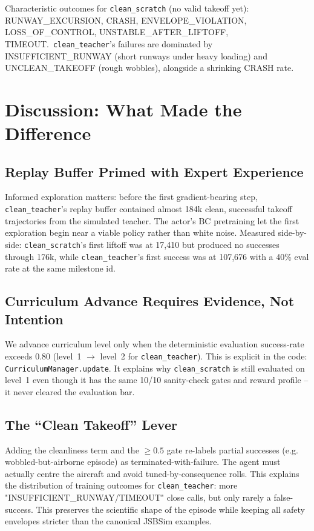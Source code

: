 \documentclass[11pt,a4paper]{article}
\begin{document}
Characteristic outcomes for \texttt{clean\_scratch} (no valid takeoff yet): RUNWAY\_EXCURSION, CRASH,
ENVELOPE\_VIOLATION, LOSS\_OF\_CONTROL, UNSTABLE\_AFTER\_LIFTOFF, TIMEOUT.\ \texttt{clean\_teacher}'s
failures are dominated by INSUFFICIENT\_RUNWAY (short runways under heavy loading) and UNCLEAN\_TAKEOFF
(rough wobbles), alongside a shrinking CRASH rate.

\section{Discussion: What Made the Difference}
\subsection{Replay Buffer Primed with Expert Experience}
Informed exploration matters: before the first gradient-bearing step, \texttt{clean\_teacher}'s replay buffer
contained almost 184k clean, successful takeoff trajectories from the simulated teacher. The actor's BC pretraining
let the first exploration begin near a viable policy rather than white noise. Measured side-by-side:
\texttt{clean\_scratch}'s first liftoff was at 17,410 but produced no successes through 176k, while
\texttt{clean\_teacher}'s first success was at 107,676 with a 40\% eval rate at the same milestone id.

\subsection{Curriculum Advance Requires Evidence, Not Intention}
We advance curriculum level only when the deterministic evaluation success-rate exceeds 0.80 (level~1 $\to$ level~2 for \texttt{clean\_teacher}).
This is explicit in the code: \texttt{CurriculumManager.update}. It explains why \texttt{clean\_scratch} is still
evaluated on level~1 even though it has the same 10/10 sanity-check gates and reward profile -- it never cleared the
evaluation bar.

\subsection{The ``Clean Takeoff'' Lever}
Adding the cleanliness term and the $\ge 0.5$ gate re-labels partial successes (e.g. wobbled-but-airborne episode)
as terminated-with-failure. The agent must actually centre the aircraft and avoid tuned-by-consequence rolls. This
explains the distribution of training outcomes for \texttt{clean\_teacher}: more "INSUFFICIENT\_RUNWAY/TIMEOUT"
close calls, but only rarely a false-success. This preserves the scientific shape of the episode while keeping all
safety envelopes stricter than the canonical JSBSim examples.
\end{document}
